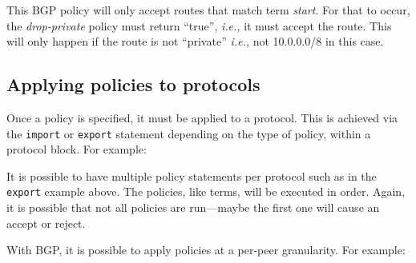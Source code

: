 This BGP policy will only accept routes that match term {\em start}.  For that
to occur, the {\em drop-private} policy must return ``true'', {\em i.e.,} it
must accept the route.  This will only happen if the route is not ``private''
{\em i.e.,} not 10.0.0.0/8 in this case.  

\subsection{Applying policies to protocols}
Once a policy is specified, it must be applied to a protocol.  This is achieved
via the {\tt import} or {\tt export} statement depending on the type of policy,
within a protocol block.  For example:

\noindent{}

It is possible to have multiple policy statements per protocol such as in the
{\tt export} example above.  The policies, like terms, will be executed in
order.  Again, it is possible that not all policies are run---maybe the first
one will cause an accept or reject.

With BGP, it is possible to apply policies at a per-peer granularity.  For
example:

\noindent{}


